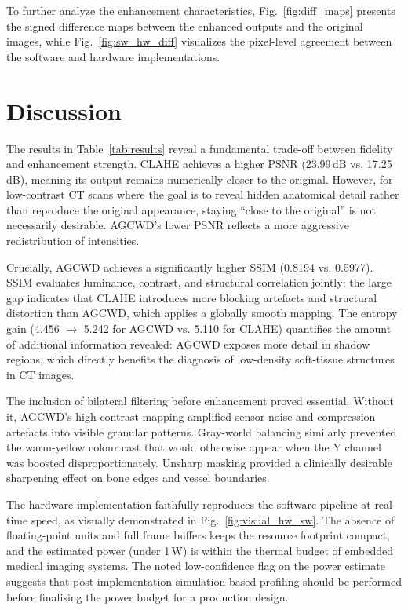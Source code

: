 \documentclass[conference]{IEEEtran}
\begin{document}
To further analyze the enhancement characteristics, Fig.~\ref{fig:diff_maps} presents the signed difference maps between the enhanced outputs and the original images, while Fig.~\ref{fig:sw_hw_diff} visualizes the pixel-level agreement between the software and hardware implementations.

\section{Discussion}
\label{sec:discussion}

The results in Table~\ref{tab:results} reveal a fundamental trade-off between fidelity and enhancement strength. CLAHE achieves a higher PSNR (23.99\,dB vs. 17.25\,dB), meaning its output remains numerically closer to the original. However, for low-contrast CT scans where the goal is to reveal hidden anatomical detail rather than reproduce the original appearance, staying ``close to the original'' is not necessarily desirable. AGCWD's lower PSNR reflects a more aggressive redistribution of intensities.

Crucially, AGCWD achieves a significantly higher SSIM (0.8194 vs. 0.5977). SSIM evaluates luminance, contrast, and structural correlation jointly; the large gap indicates that CLAHE introduces more blocking artefacts and structural distortion than AGCWD, which applies a globally smooth mapping. The entropy gain (4.456 $\rightarrow$ 5.242 for AGCWD vs. 5.110 for CLAHE) quantifies the amount of additional information revealed: AGCWD exposes more detail in shadow regions, which directly benefits the diagnosis of low-density soft-tissue structures in CT images.

The inclusion of bilateral filtering before enhancement proved essential. Without it, AGCWD's high-contrast mapping amplified sensor noise and compression artefacts into visible granular patterns. Gray-world balancing similarly prevented the warm-yellow colour cast that would otherwise appear when the Y channel was boosted disproportionately. Unsharp masking provided a clinically desirable sharpening effect on bone edges and vessel boundaries.

The hardware implementation faithfully reproduces the software pipeline at real-time speed, as visually demonstrated in Fig.~\ref{fig:visual_hw_sw}. The absence of floating-point units and full frame buffers keeps the resource footprint compact, and the estimated power (under 1\,W) is within the thermal budget of embedded medical imaging systems. The noted low-confidence flag on the power estimate suggests that post-implementation simulation-based profiling should be performed before finalising the power budget for a production design.
\end{document}
